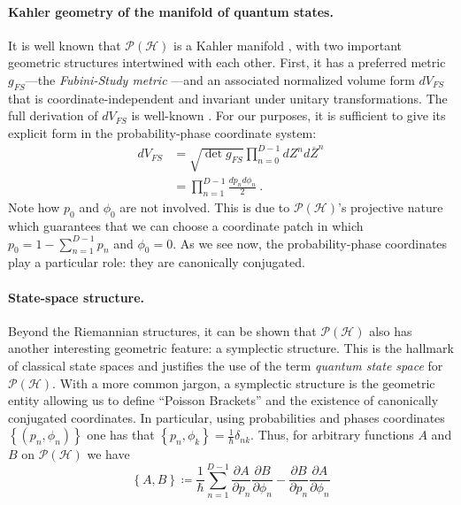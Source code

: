\documentclass[%
 reprint,
 superscriptaddress,
 aps,
 pra,
]{revtex4-2}
\newcommand{\PH}{\mathcal{P}(\mathcal{H})}
\theoremstyle{definition}
\begin{document}
\paragraph*{Kahler geometry of the manifold of quantum states.}
It is well known that $\mathcal{P}(\mathcal{H})$ is a Kahler manifold \cite{Bengtsson2017GeometryQuantumStates}, 
with two important geometric structures intertwined with each other. First, 
it has a preferred metric $g_{FS}$---the \emph{Fubini-Study metric} \cite{Bengtsson2017GeometryQuantumStates}---and an 
associated normalized volume form $dV_{FS}$ that is coordinate-independent and
invariant under unitary transformations. The full derivation of $dV_{FS}$
is well-known \cite{Bengtsson2017GeometryQuantumStates}. For our purposes, it is sufficient 
to give its explicit form in the probability-phase coordinate system:
\begin{align*}
dV_{FS}
  & = \sqrt{\det g_{FS}}
  \prod_{n=0}^{D-1} dZ^n d\overline{Z}^n \\
  & =  \prod_{n=1}^{D-1} \frac{dp_n d\phi_n}{2}
  ~.
\end{align*}
Note how $p_0$ and $\phi_0$ are not involved. This is due to
$\mathcal{P}(\mathcal{H})$'s projective nature which guarantees that we can
choose a coordinate patch in which $p_0 = 1 - \sum_{n=1}^{D-1}p_n$
and $\phi_0 = 0$. As we see now, the probability-phase coordinates play a 
particular role: they are canonically conjugated.

\paragraph*{State-space structure.} Beyond the Riemannian structures, it can 
be shown that $\PH$ also has another interesting geometric feature: a symplectic structure.
This is the hallmark of classical state spaces and justifies the use of the term 
\emph{quantum state space} for $\PH$. With a more common jargon, a symplectic
structure is the geometric entity allowing us to define ``Poisson Brackets''
and the existence of canonically conjugated coordinates. In particular, using 
probabilities and phases coordinates $\left\{ (p_n,\phi_n)\right\}$
one has that $\left\{ p_n , \phi_k \right\} = \frac{1}{\hbar}\delta_{nk}$. Thus,
for arbitrary functions $A$ and $B$ on $\PH$ we have
\begin{equation}
\left\{ A, B\right\} \coloneqq \frac{1}{\hbar}\sum_{n=1}^{D-1} \frac{\partial A}{\partial p_n} \frac{\partial B}{\partial \phi_n} - \frac{\partial B}{\partial p_n} \frac{\partial A}{\partial \phi_n}
\end{equation}
\end{document}
